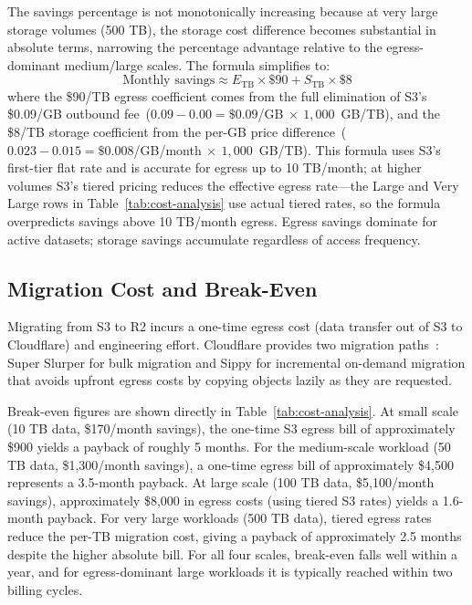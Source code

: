 The savings percentage is not monotonically increasing because at very large storage volumes (500 TB), the storage cost difference becomes substantial in absolute terms, narrowing the percentage advantage relative to the egress-dominant medium/large scales. The formula simplifies to:
\[
\text{Monthly savings} \approx E_{\text{TB}} \times \$90 + S_{\text{TB}} \times \$8
\]
where the \$90/TB egress coefficient comes from the full elimination of S3's \$0.09/GB outbound fee~($0.09 - 0.00 = \$0.09$/GB$~\times~1{,}000$~GB/TB), and the \$8/TB storage coefficient from the per-GB price difference~($0.023 - 0.015 = \$0.008$/GB/month$~\times~1{,}000$~GB/TB). This formula uses S3's first-tier flat rate and is accurate for egress up to 10 TB/month; at higher volumes S3's tiered pricing reduces the effective egress rate---the Large and Very Large rows in Table~\ref{tab:cost-analysis} use actual tiered rates, so the formula overpredicts savings above 10 TB/month egress. Egress savings dominate for active datasets; storage savings accumulate regardless of access frequency.

\subsection{Migration Cost and Break-Even}\label{sec:migration-break-even}

Migrating from S3 to R2 incurs a one-time egress cost (data transfer out of S3 to Cloudflare) and engineering effort. Cloudflare provides two migration paths~\cite{cloudflare-super-slurper,cloudflare-sippy}: Super Slurper for bulk migration and Sippy for incremental on-demand migration that avoids upfront egress costs by copying objects lazily as they are requested.

Break-even figures are shown directly in Table~\ref{tab:cost-analysis}. At small scale (10 TB data, \$170/month savings), the one-time S3 egress bill of approximately \$900 yields a payback of roughly 5 months. For the medium-scale workload (50 TB data, \$1,300/month savings), a one-time egress bill of approximately \$4,500 represents a 3.5-month payback. At large scale (100 TB data, \$5,100/month savings), approximately \$8,000 in egress costs (using tiered S3 rates) yields a 1.6-month payback. For very large workloads (500 TB data), tiered egress rates reduce the per-TB migration cost, giving a payback of approximately 2.5 months despite the higher absolute bill. For all four scales, break-even falls well within a year, and for egress-dominant large workloads it is typically reached within two billing cycles.


